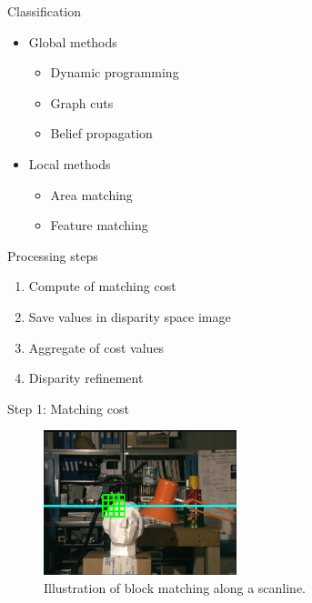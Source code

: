 \documentclass[10pt]{beamer}
\begin{document}
\begin{frame}[fragile]{Classification}
  \begin{itemize}
    \item Global methods
    \begin{itemize}
      \item Dynamic programming
      \item Graph cuts
      \item Belief propagation
    \end{itemize}
    \item Local methods
    \begin{itemize}
      \item Area matching
      \item Feature matching
    \end{itemize}
  \end{itemize}
\end{frame}

\begin{frame}[fragile]{Processing steps}
  \begin{enumerate}
    \item Compute of matching cost
    \item Save values in disparity space image
    \item Aggregate of cost values
    \item Disparity refinement
  \end{enumerate}
\end{frame}

\begin{frame}[fragile]{Step 1: Matching cost}
  \begin{figure}[h!]
    \centering
    \includegraphics[width=0.5\textwidth]{../paper/src/images/tsukuba-block.png}
    \caption[Block matching along scanlines]{Illustration of block matching along a scanline.}
  \end{figure}
\end{frame}
\end{document}
